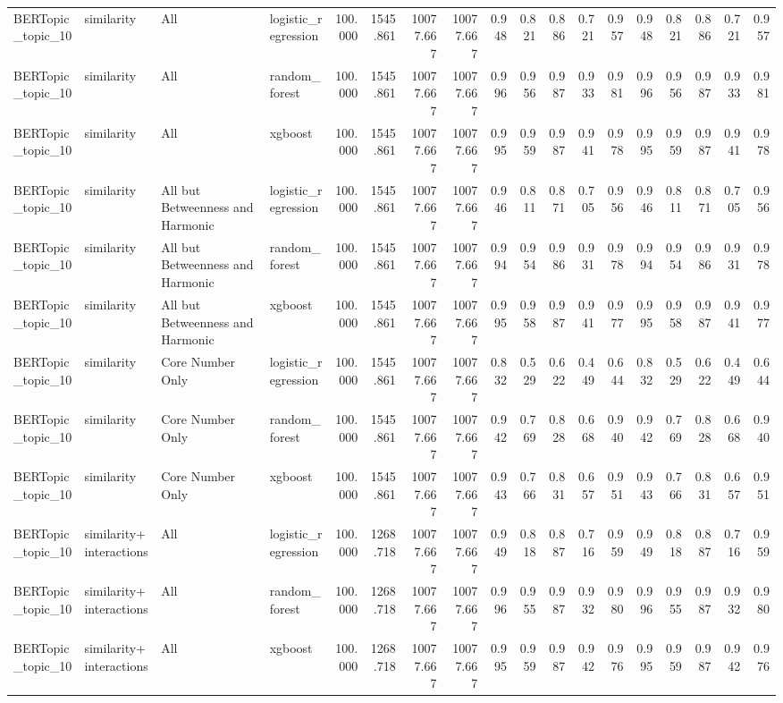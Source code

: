 \begin{tabular}{llllrrrrrrrrrrrrrr}
BERTopic_topic_10 & similarity & All & logistic_regression & 100.000 & 1545.861 & 10077.667 & 10077.667 & 0.948 & 0.821 & 0.886 & 0.721 & 0.957 & 0.948 & 0.821 & 0.886 & 0.721 & 0.957 \\
BERTopic_topic_10 & similarity & All & random_forest & 100.000 & 1545.861 & 10077.667 & 10077.667 & 0.996 & 0.956 & 0.987 & 0.933 & 0.981 & 0.996 & 0.956 & 0.987 & 0.933 & 0.981 \\
BERTopic_topic_10 & similarity & All & xgboost & 100.000 & 1545.861 & 10077.667 & 10077.667 & 0.995 & 0.959 & 0.987 & 0.941 & 0.978 & 0.995 & 0.959 & 0.987 & 0.941 & 0.978 \\
BERTopic_topic_10 & similarity & All but Betweenness and Harmonic & logistic_regression & 100.000 & 1545.861 & 10077.667 & 10077.667 & 0.946 & 0.811 & 0.871 & 0.705 & 0.956 & 0.946 & 0.811 & 0.871 & 0.705 & 0.956 \\
BERTopic_topic_10 & similarity & All but Betweenness and Harmonic & random_forest & 100.000 & 1545.861 & 10077.667 & 10077.667 & 0.994 & 0.954 & 0.986 & 0.931 & 0.978 & 0.994 & 0.954 & 0.986 & 0.931 & 0.978 \\
BERTopic_topic_10 & similarity & All but Betweenness and Harmonic & xgboost & 100.000 & 1545.861 & 10077.667 & 10077.667 & 0.995 & 0.958 & 0.987 & 0.941 & 0.977 & 0.995 & 0.958 & 0.987 & 0.941 & 0.977 \\
BERTopic_topic_10 & similarity & Core Number Only & logistic_regression & 100.000 & 1545.861 & 10077.667 & 10077.667 & 0.832 & 0.529 & 0.622 & 0.449 & 0.644 & 0.832 & 0.529 & 0.622 & 0.449 & 0.644 \\
BERTopic_topic_10 & similarity & Core Number Only & random_forest & 100.000 & 1545.861 & 10077.667 & 10077.667 & 0.942 & 0.769 & 0.828 & 0.668 & 0.940 & 0.942 & 0.769 & 0.828 & 0.668 & 0.940 \\
BERTopic_topic_10 & similarity & Core Number Only & xgboost & 100.000 & 1545.861 & 10077.667 & 10077.667 & 0.943 & 0.766 & 0.831 & 0.657 & 0.951 & 0.943 & 0.766 & 0.831 & 0.657 & 0.951 \\
BERTopic_topic_10 & similarity+interactions & All & logistic_regression & 100.000 & 1268.718 & 10077.667 & 10077.667 & 0.949 & 0.818 & 0.887 & 0.716 & 0.959 & 0.949 & 0.818 & 0.887 & 0.716 & 0.959 \\
BERTopic_topic_10 & similarity+interactions & All & random_forest & 100.000 & 1268.718 & 10077.667 & 10077.667 & 0.996 & 0.955 & 0.987 & 0.932 & 0.980 & 0.996 & 0.955 & 0.987 & 0.932 & 0.980 \\
BERTopic_topic_10 & similarity+interactions & All & xgboost & 100.000 & 1268.718 & 10077.667 & 10077.667 & 0.995 & 0.959 & 0.987 & 0.942 & 0.976 & 0.995 & 0.959 & 0.987 & 0.942 & 0.976 \\

\end{tabular}
